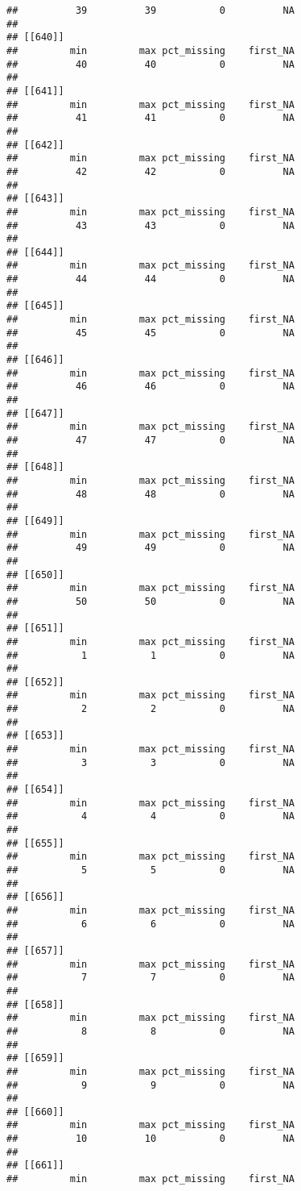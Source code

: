 \documentclass[
]{article}
\begin{document}
\begin{verbatim}
##          39          39           0          NA 
## 
## [[640]]
##         min         max pct_missing    first_NA 
##          40          40           0          NA 
## 
## [[641]]
##         min         max pct_missing    first_NA 
##          41          41           0          NA 
## 
## [[642]]
##         min         max pct_missing    first_NA 
##          42          42           0          NA 
## 
## [[643]]
##         min         max pct_missing    first_NA 
##          43          43           0          NA 
## 
## [[644]]
##         min         max pct_missing    first_NA 
##          44          44           0          NA 
## 
## [[645]]
##         min         max pct_missing    first_NA 
##          45          45           0          NA 
## 
## [[646]]
##         min         max pct_missing    first_NA 
##          46          46           0          NA 
## 
## [[647]]
##         min         max pct_missing    first_NA 
##          47          47           0          NA 
## 
## [[648]]
##         min         max pct_missing    first_NA 
##          48          48           0          NA 
## 
## [[649]]
##         min         max pct_missing    first_NA 
##          49          49           0          NA 
## 
## [[650]]
##         min         max pct_missing    first_NA 
##          50          50           0          NA 
## 
## [[651]]
##         min         max pct_missing    first_NA 
##           1           1           0          NA 
## 
## [[652]]
##         min         max pct_missing    first_NA 
##           2           2           0          NA 
## 
## [[653]]
##         min         max pct_missing    first_NA 
##           3           3           0          NA 
## 
## [[654]]
##         min         max pct_missing    first_NA 
##           4           4           0          NA 
## 
## [[655]]
##         min         max pct_missing    first_NA 
##           5           5           0          NA 
## 
## [[656]]
##         min         max pct_missing    first_NA 
##           6           6           0          NA 
## 
## [[657]]
##         min         max pct_missing    first_NA 
##           7           7           0          NA 
## 
## [[658]]
##         min         max pct_missing    first_NA 
##           8           8           0          NA 
## 
## [[659]]
##         min         max pct_missing    first_NA 
##           9           9           0          NA 
## 
## [[660]]
##         min         max pct_missing    first_NA 
##          10          10           0          NA 
## 
## [[661]]
##         min         max pct_missing    first_NA 

\end{verbatim}
\end{document}
